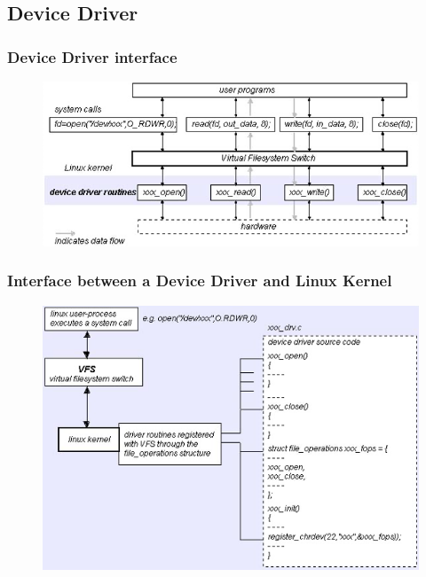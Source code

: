 \subsection{Device Driver} %
\begin{frame}[fragile]
    \frametitle{Device Driver interface}
    \begin{figure}
    \includegraphics[width=0.8\linewidth]{figs/driver-interface.png}
    \end{figure}
\end{frame}
% 
% 
% 
\begin{frame}[fragile]
    \frametitle{Interface between a Device Driver and Linux Kernel}
    \begin{figure}
    \includegraphics[width=0.8\linewidth]{figs/kernel-interface.png}
    \end{figure}
\end{frame}
